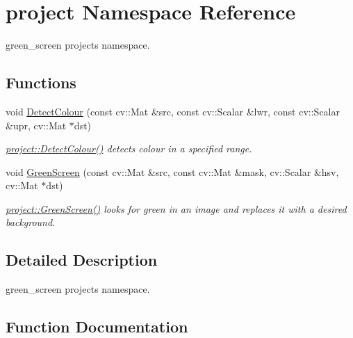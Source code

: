\hypertarget{namespaceproject}{}\section{project Namespace Reference}
\label{namespaceproject}


green\+\_\+screen project\textquotesingle{}s namespace.  


\subsection*{Functions}
\begin{DoxyCompactItemize}
\item 
void \hyperlink{namespaceproject_affc48da52781e6e514957844fd630f37}{Detect\+Colour} (const cv\+::\+Mat \&src, const cv\+::\+Scalar \&lwr, const cv\+::\+Scalar \&upr, cv\+::\+Mat $\ast$dst)
\begin{DoxyCompactList}\small\item\em \hyperlink{namespaceproject_affc48da52781e6e514957844fd630f37}{project\+::\+Detect\+Colour()} detects colour in a specified range. \end{DoxyCompactList}\item 
void \hyperlink{namespaceproject_a83798561db3dfd039d3f7dce24b3424f}{Green\+Screen} (const cv\+::\+Mat \&src, const cv\+::\+Mat \&mask, cv\+::\+Scalar \&hsv, cv\+::\+Mat $\ast$dst)
\begin{DoxyCompactList}\small\item\em \hyperlink{namespaceproject_a83798561db3dfd039d3f7dce24b3424f}{project\+::\+Green\+Screen()} looks for green in an image and replaces it with a desired background. \end{DoxyCompactList}\end{DoxyCompactItemize}


\subsection{Detailed Description}
green\+\_\+screen project\textquotesingle{}s namespace. 

\subsection{Function Documentation}
\mbox{\label{namespaceproject_affc48da52781e6e514957844fd630f37}} 
